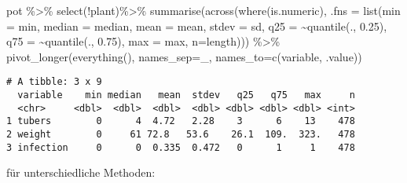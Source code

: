\documentclass[
  letterpaper,
  DIV=11,
  numbers=noendperiod]{scrartcl}
\newenvironment{Shaded}{\begin{snugshade}}{\end{snugshade}}
\newcommand{\AttributeTok}[1]{\textcolor[rgb]{0.40,0.45,0.13}{#1}}
\newcommand{\FloatTok}[1]{\textcolor[rgb]{0.68,0.00,0.00}{#1}}
\newcommand{\FunctionTok}[1]{\textcolor[rgb]{0.28,0.35,0.67}{#1}}
\newcommand{\NormalTok}[1]{\textcolor[rgb]{0.00,0.23,0.31}{#1}}
\newcommand{\SpecialCharTok}[1]{\textcolor[rgb]{0.37,0.37,0.37}{#1}}
\newcommand{\StringTok}[1]{\textcolor[rgb]{0.13,0.47,0.30}{#1}}
\begin{document}
\begin{Shaded}
\begin{Highlighting}[]
\NormalTok{pot }\SpecialCharTok{\%\textgreater{}\%} 
  \FunctionTok{select}\NormalTok{(}\SpecialCharTok{!}\NormalTok{plant)}\SpecialCharTok{\%\textgreater{}\%} 
  \FunctionTok{summarise}\NormalTok{(}\FunctionTok{across}\NormalTok{(}\FunctionTok{where}\NormalTok{(is.numeric), }\AttributeTok{.fns =} 
                     \FunctionTok{list}\NormalTok{(}\AttributeTok{min =}\NormalTok{ min,}
                          \AttributeTok{median =}\NormalTok{ median,}
                          \AttributeTok{mean =}\NormalTok{ mean,}
                          \AttributeTok{stdev =}\NormalTok{ sd,}
                          \AttributeTok{q25 =} \SpecialCharTok{\textasciitilde{}}\FunctionTok{quantile}\NormalTok{(., }\FloatTok{0.25}\NormalTok{),}
                          \AttributeTok{q75 =} \SpecialCharTok{\textasciitilde{}}\FunctionTok{quantile}\NormalTok{(., }\FloatTok{0.75}\NormalTok{),}
                          \AttributeTok{max =}\NormalTok{ max, }
                          \AttributeTok{n=}\NormalTok{length))) }\SpecialCharTok{\%\textgreater{}\%}
  \FunctionTok{pivot\_longer}\NormalTok{(}\FunctionTok{everything}\NormalTok{(), }\AttributeTok{names\_sep=}\StringTok{\textquotesingle{}\_\textquotesingle{}}\NormalTok{, }\AttributeTok{names\_to=}\FunctionTok{c}\NormalTok{(}\StringTok{\textquotesingle{}variable\textquotesingle{}}\NormalTok{, }\StringTok{\textquotesingle{}.value\textquotesingle{}}\NormalTok{))}
\end{Highlighting}
\end{Shaded}

\begin{verbatim}
# A tibble: 3 x 9
  variable    min median   mean  stdev   q25   q75   max     n
  <chr>     <dbl>  <dbl>  <dbl>  <dbl> <dbl> <dbl> <dbl> <int>
1 tubers        0      4  4.72   2.28    3      6    13    478
2 weight        0     61 72.8   53.6    26.1  109.  323.   478
3 infection     0      0  0.335  0.472   0      1     1    478
\end{verbatim}

für unterschiedliche Methoden:
\end{document}
